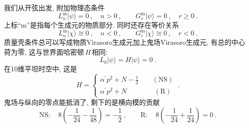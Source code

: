 我们从开弦出发, 附加物理态条件
\begin{equation}
    L_{n}^{\mathrm{m}}\lvert \psi \rangle=0 \:, \quad n >0 \:,\qquad
    G_{r}^{\mathrm{m}}\lvert\psi \rangle =0\:, \quad r\geq 0 \:. \label{10.5.1}
\end{equation}
上标``m''是指每个生成元的物质部分. 同时还存在等价关系
\begin{equation}
    L_{n}^{\mathrm{m}}\lvert \chi \rangle \cong 0 \:, \quad n<0 \:,\qquad
    G_{r}^{\mathrm{m}}\lvert\chi \rangle \cong 0\:, \quad r< 0 \:. \label{10.5.2}
\end{equation}
质量壳条件总可以写成物质Virasoro生成元加上鬼场Virasoro生成元, 有总的中心荷为零, 这与世界面哈密顿$\,H\,$相同:
\begin{equation}
    L_{0}\lvert\psi\rangle = H\lvert\psi\rangle =0\:. \label{10.5.3}
\end{equation}
在10维平坦时空中, 这是
\begin{equation}
    H= \left\{
    \begin{array}{l}
         \alpha^{\prime}p^{2}+N-\frac{1}{2} \qquad (\text{NS})   \\
          \alpha^{\prime}p^{2}+N \qquad\qquad (\text{R})
    \end{array} \right. \:. \label{10.5.4}
\end{equation}
鬼场与纵向的零点能抵消了, 剩下的是横向模的贡献
\begin{equation}
    \text{NS}:\quad 8\left(-\frac{1}{24}-\frac{1}{48}\right) = -\frac{1}{2} \:, \qquad
    \text{R}: \quad 8\left(-\frac{1}{24}+\frac{1}{24}\right) = 0 \:. \label{10.5.5}
\end{equation}

